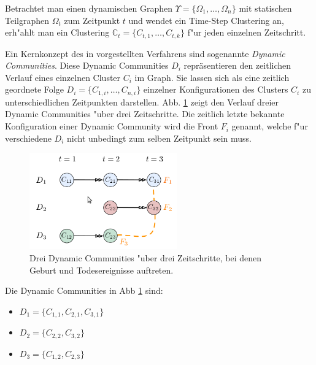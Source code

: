 \documentclass[journal]{vgtc}
\begin{document}
    Betrachtet man einen dynamischen Graphen $\Upsilon = \{ \Omega_1, \dots, \Omega_n \}$ mit statischen Teilgraphen $\Omega_t$ zum Zeitpunkt $t$ 
    und wendet ein Time-Step Clustering an, erh"ahlt man ein Clustering
    $\mathbb{C}_t = \{ C_{t,1}, \dots, C_{t,k}\}$ f"ur jeden einzelnen Zeitschritt.
    
    Ein Kernkonzept des in \cite{timestep} vorgestellten Verfahrens sind sogenannte \emph{Dynamic Communities}. Diese Dynamic
    Communities $D_i$ repräsentieren den zeitlichen Verlauf eines einzelnen Cluster $C_i$ im Graph. Sie lassen sich als eine zeitlich 
    geordnete Folge $D_i = \{ C_{1,i}, \dots, C_{n,i} \}$ einzelner Konfigurationen des Clusters $C_i$ zu unterschiedlichen Zeitpunkten
    darstellen. Abb. \ref{fig:dynamic1} zeigt den Verlauf dreier Dynamic Communities "uber drei Zeitschritte. Die zeitlich letzte bekannte Konfiguration
    einer Dynamic Community wird die Front $F_i$ genannt, welche f"ur verschiedene $D_i$ nicht unbedingt zum selben Zeitpunkt sein muss.
    \begin{figure}[h]
      \centering
      \includegraphics[width=2.5in]{images/dynamic_communities1}
      \caption{\label{fig:dynamic1} Drei Dynamic Communities "uber drei Zeitschritte, bei denen Geburt und Todesereignisse auftreten.\cite{timestep}}
    \end{figure}
    
    Die Dynamic Communities in Abb \ref{fig:dynamic1} sind:
    \begin{itemize}
      \item $D_1 =\{C_{1,1}, C_{2,1}, C_{3,1}\}$
      \item $D_2 =\{C_{2,2}, C_{3,2}\}$
      \item $D_3 =\{C_{1,2}, C_{2,3}\}$
    \end{itemize}
    
\end{document}
